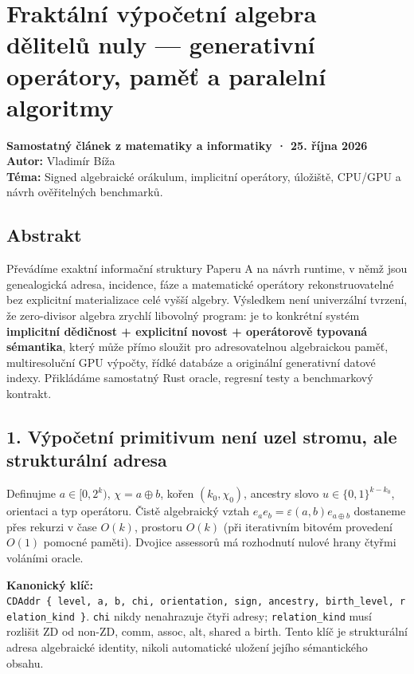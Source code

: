 \documentclass[
  10pt,
]{article}
\author{}
\date{}
\begin{document}
{
\setcounter{tocdepth}{3}
\tableofcontents
}
\section{Fraktální výpočetní algebra dělitelů nuly --- generativní
operátory, paměť a paralelní
algoritmy}\label{fraktuxe1lnuxed-vuxfdpoux10detnuxed-algebra-dux11blitelux16f-nuly-generativnuxed-operuxe1tory-pamux11bux165-a-paralelnuxed-algoritmy}

\textbf{Samostatný článek z matematiky a informatiky · 25. října 2026}\\
\textbf{Autor:} Vladimír Bíža\\
\textbf{Téma:} Signed algebraické orákulum, implicitní operátory,
úložiště, CPU/GPU a návrh ověřitelných benchmarků.

\subsection{Abstrakt}\label{abstrakt}

Převádíme exaktní informační struktury Paperu A na návrh runtime, v němž
jsou genealogická adresa, incidence, fáze a matematické operátory
rekonstruovatelné bez explicitní materializace celé vyšší algebry.
Výsledkem není univerzální tvrzení, že zero-divisor algebra zrychlí
libovolný program: je to konkrétní systém \textbf{implicitní dědičnost +
explicitní novost + operátorově typovaná sémantika}, který může přímo
sloužit pro adresovatelnou algebraickou paměť, multiresoluční GPU
výpočty, řídké databáze a originální generativní datové indexy.
Přikládáme samostatný Rust oracle, regresní testy a benchmarkový
kontrakt.

\subsection{1. Výpočetní primitivum není uzel stromu, ale strukturální
adresa}\label{vuxfdpoux10detnuxed-primitivum-nenuxed-uzel-stromu-ale-strukturuxe1lnuxed-adresa}

Definujme \(a\in[0,2^k)\), \(\chi=a\oplus b\), kořen \((k_0,\chi_0)\),
ancestry slovo \(u\in\{0,1\}^{k-k_0}\), orientaci a typ operátoru. Čistě
algebraický vztah \(e_a e_b=\varepsilon(a,b)e_{a\oplus b}\) dostaneme
přes rekurzi v čase \(O(k)\), prostoru \(O(k)\) (při iterativním bitovém
provedení \(O(1)\) pomocné paměti). Dvojice assessorů má rozhodnutí
nulové hrany čtyřmi voláními oracle.

\textbf{Kanonický klíč:}
\texttt{CDAddr\ \{\ level,\ a,\ b,\ chi,\ orientation,\ sign,\ ancestry,\ birth\_level,\ relation\_kind\ \}}.
\texttt{chi} nikdy nenahrazuje čtyři adresy; \texttt{relation\_kind}
musí rozlišit ZD od non-ZD, comm, assoc, alt, shared a birth. Tento klíč
je strukturální adresa algebraické identity, nikoli automatické uložení
jejího sémantického obsahu.
\end{document}
